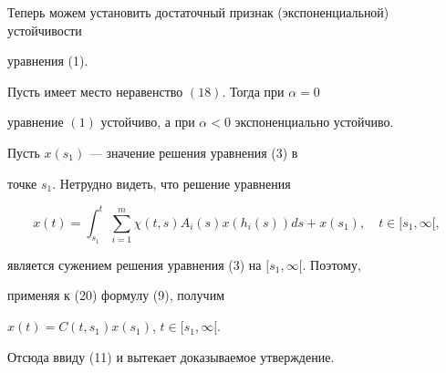 Теперь можем установить достаточный признак (экспоненциальной) устойчивости


уравнения (1).





\begin{thm}


Пусть имеет место неравенство $(18)$. Тогда при  $\alpha=0$


уравнение $(1)$ устойчиво, а при $\alpha<0$ экспоненциально устойчиво.


\end{thm}





\begin{pf}


Пусть $x(s_1)$ --- значение решения уравнения (3) в


точке $s_1$. Нетрудно видеть, что решение уравнения


\begin{equation}


x(t)=\int_{s_1}^t\sum_{i=1}^m \chi(t,s)A_i(s)x(h_i(s))ds+


x(s_1), \quad t\in  [s_1,\infty[,


\end{equation}


является сужением решения  уравнения (3) на $[s_1,\infty[$. Поэтому,


применяя к (20) формулу (9), получим


$x(t)=C(t,s_1)x(s_1)$, $t\in [s_1,\infty[$.





Отсюда ввиду (11) и вытекает доказываемое утверждение.


\end{pf}





